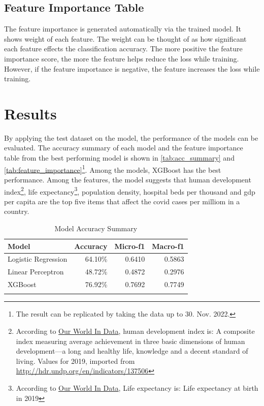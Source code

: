 \documentclass[10pt, a4paper, twocolumn]{article} %
\begin{document}
\subsection{Feature Importance Table}
The feature importance is generated automatically via the trained model. It shows weight of each feature. The weight can 
be thought of as how significant each feature effects the classification accuracy. The more positive the feature importance 
score, the more the feature helps reduce the loss while training. However, if the feature importance is negative, the feature 
increases the loss while training.
\section{Results}
By applying the test dataset on the model, the performance of the models can be evaluated. The accuracy summary of each 
model and the feature importance table from the best performing model is shown in \autoref{tab:acc_summary} and 
\autoref{tab:feature_importance}\footnote{The result can be replicated by taking the data up to 30. Nov. 2022.}. 
Among the models, XGBoost has the best performance. Among the features, the model suggests 
that human development index\footnote{According to \href{https://github.com/owid/covid-19-data/tree/master/public/data}{Our World In Data}, 
human development index is: A composite index measuring average achievement in three basic dimensions of human 
development—a long and healthy life, knowledge and a decent standard of living. Values for 2019, imported from 
\url{http://hdr.undp.org/en/indicators/137506}}, life expectancy\footnote{According to 
\href{https://github.com/owid/covid-19-data/tree/master/public/data}{Our World In Data}, Life expectancy is: Life 
expectancy at birth in 2019}, population density, hospital beds per thousand 
and gdp per capita are the top five items that affect the covid cases per milliom in a country.
\begin{table}
	\caption{Model Accuracy Summary}
	\centering
	\begin{tabular}{lrrr}
		\toprule
		\textbf{Model} & \textbf{Accuracy} & \textbf{Micro-f1} & \textbf{Macro-f1} \\
		\midrule
		Logistic Regression & 64.10\% & 0.6410 & 0.5863 \\
		Linear Perceptron & 48.72\% & 0.4872 & 0.2976 \\
		XGBoost & 76.92\% & 0.7692 &0.7749 \\
		\bottomrule
	\label{tab:acc_summary}
	\end{tabular}
\end{table}
\end{document}
